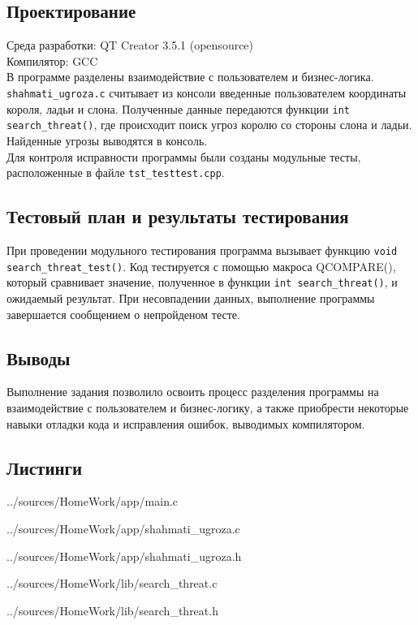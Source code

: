 \documentclass[12pt,a4paper]{report}
\begin{document}
\subsection{Проектирование}
Среда разработки: QT Creator 3.5.1 (opensource)
\\
Компилятор: GCC
\\
В программе разделены взаимодействие с пользователем и бизнес-логика. \verb+shahmati_ugroza.c+ считывает из консоли введенные пользователем координаты короля, ладьи и слона. Полученные данные передаются функции \verb+int search_threat()+, где происходит поиск угроз королю со стороны слона и ладьи. Найденные угрозы выводятся в консоль.
\\
Для контроля исправности программы были созданы модульные тесты, расположенные в файле \verb+tst_testtest.cpp+.

 
\subsection{Тестовый план и результаты тестирования}

При проведении модульного тестирования программа вызывает функцию \verb+void search_threat_test()+. Код тестируется с помощью макроса QCOMPARE(), который сравнивает значение, полученное в функции \verb+int search_threat()+, и ожидаемый результат. При несовпадении данных, выполнение программы завершается сообщением о непройденом тесте.

\subsection{Выводы}

Выполнение задания позволило освоить процесс разделения программы на взаимодействие с пользователем и бизнес-логику, а также приобрести некоторые навыки отладки кода и исправления ошибок, выводимых компилятором.

\subsection*{Листинги}

{../sources/HomeWork/app/main.c}


{../sources/HomeWork/app/shahmati_ugroza.c}


{../sources/HomeWork/app/shahmati_ugroza.h}


{../sources/HomeWork/lib/search_threat.c}


{../sources/HomeWork/lib/search_threat.h}
\end{document}
